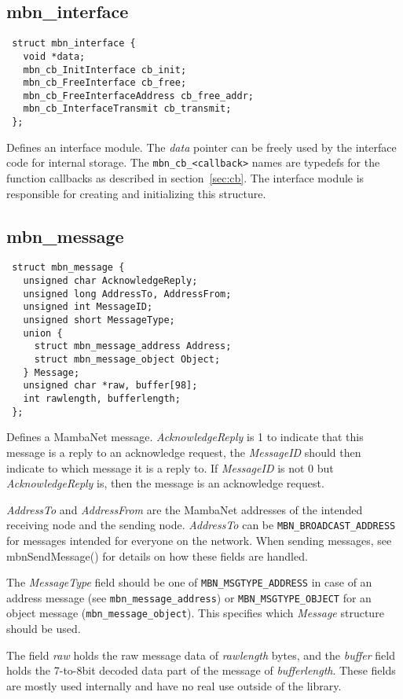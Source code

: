 \documentclass[a4paper]{report}
\begin{document}
\subsection{mbn\_interface}
\begin{verbatim}
 struct mbn_interface {
   void *data;
   mbn_cb_InitInterface cb_init;
   mbn_cb_FreeInterface cb_free;
   mbn_cb_FreeInterfaceAddress cb_free_addr;
   mbn_cb_InterfaceTransmit cb_transmit;
 };
\end{verbatim}
Defines an interface module. The \textit{data} pointer can be freely used by the interface code for internal storage. The \verb|mbn_cb_<callback>| names are typedefs for the function callbacks as described in section\ \ref{sec:cb}.
The interface module is responsible for creating and initializing this structure.


\subsection{mbn\_message}
\begin{verbatim}
 struct mbn_message {
   unsigned char AcknowledgeReply;
   unsigned long AddressTo, AddressFrom;
   unsigned int MessageID;
   unsigned short MessageType;
   union {
     struct mbn_message_address Address;
     struct mbn_message_object Object;
   } Message;
   unsigned char *raw, buffer[98];
   int rawlength, bufferlength;
 };
\end{verbatim}
Defines a MambaNet message. \textit{AcknowledgeReply} is 1 to indicate that this message is a reply to an acknowledge request, the \textit{MessageID} should then indicate to which message it is a reply to. If \textit{MessageID} is not 0 but \textit{AcknowledgeReply} is, then the message is an acknowledge request.

\textit{AddressTo} and \textit{AddressFrom} are the MambaNet addresses of the intended receiving node and the sending node. \textit{AddressTo} can be \verb|MBN_BROADCAST_ADDRESS| for messages intended for everyone on the network. When sending messages, see mbnSendMessage() for details on how these fields are handled.

The \textit{MessageType} field should be one of \verb|MBN_MSGTYPE_ADDRESS| in case of an address message (see \verb|mbn_message_address|) or \verb|MBN_MSGTYPE_OBJECT| for an object message (\verb|mbn_message_object|). This specifies which \textit{Message} structure should be used.

The field \textit{raw} holds the raw message data of \textit{rawlength} bytes, and the \textit{buffer} field holds the 7-to-8bit decoded data part of the message of \textit{bufferlength}. These fields are mostly used internally and have no real use outside of the library.
\end{document}
